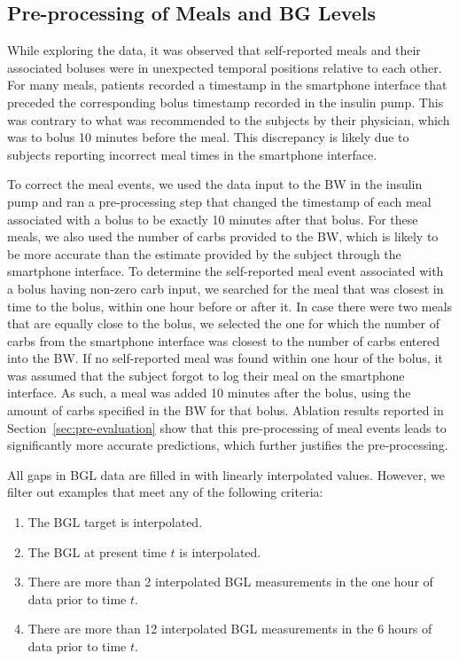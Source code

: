 \documentclass[journal,article,submit,moreauthors,pdftex]{Definitions/mdpi}
\begin{document}
\subsection{Pre-processing of Meals and BG Levels}
\label{sec:pre-processing}

While exploring the data, it was observed that self-reported meals and their associated boluses were in unexpected temporal positions relative to each other. For many meals, patients recorded a timestamp in the smartphone interface that preceded the corresponding bolus timestamp recorded in the insulin pump. This was contrary to what was recommended to the subjects by their physician, which was to bolus 10 minutes before the meal. This discrepancy is likely due to subjects reporting incorrect meal times in the smartphone interface.

To correct the meal events, we used the data input to the BW in the insulin pump and ran a pre-processing step that changed the timestamp of each meal associated with a bolus to be exactly 10 minutes after that bolus. For these meals, we also used the number of carbs provided to the BW, which is likely to be more accurate than the estimate provided by the subject through the smartphone interface. To determine the self-reported meal event associated with a bolus having non-zero carb input, we searched for the meal that was closest in time to the bolus, within one hour before or after it. In case there were two meals that are equally close to the bolus, we selected the one for which the number of carbs from the smartphone interface was closest to the number of carbs entered into the BW. If no self-reported meal was found within one hour of the bolus, it was assumed that the subject forgot to log their meal on the smartphone interface. As such, a meal was added 10 minutes after the bolus, using the amount of carbs specified in the BW for that bolus. Ablation results reported in Section~\ref{sec:pre-evaluation} show that this pre-processing of meal events leads to significantly more accurate predictions, which further justifies the pre-processing.

All gaps in BGL data are filled in with linearly interpolated values. However, we filter out examples that meet any of the following criteria:
\begin{enumerate}
    \item The BGL target is interpolated.
    \item The BGL at present time $t$ is interpolated.
    \item There are more than 2 interpolated BGL measurements in the one hour of data prior to time $t$.
    \item There are more than 12 interpolated BGL measurements in the 6 hours of data prior to time $t$.
\end{enumerate}
\end{document}
